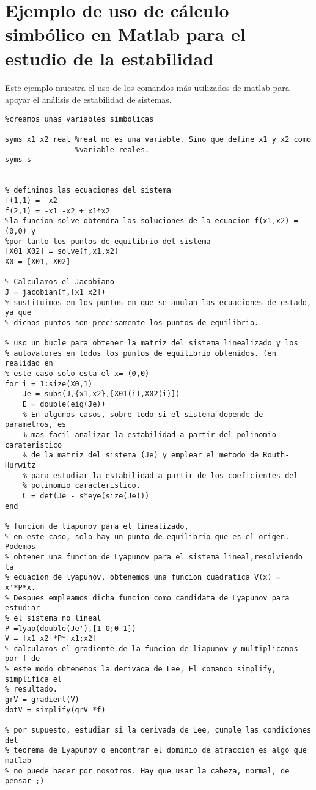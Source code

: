 \chapter[Cálculo simbolico]{Ejemplo de uso de cálculo simbólico en Matlab para el estudio de la estabilidad}
Este ejemplo muestra el uso de los comandos más utilizados de matlab para apoyar el análisis de estabilidad de sistemas.

\begin{lstlisting}
%creamos unas variables simbolicas

syms x1 x2 real %real no es una variable. Sino que define x1 y x2 como
                %variable reales. 
syms s


% definimos las ecuaciones del sistema
f(1,1) =  x2
f(2,1) = -x1 -x2 + x1*x2 
%la funcion solve obtendra las soluciones de la ecuacion f(x1,x2) =(0,0) y
%por tanto los puntos de equilibrio del sistema
[X01 X02] = solve(f,x1,x2)
X0 = [X01, X02]

% Calculamos el Jacobiano
J = jacobian(f,[x1 x2])
% sustituimos en los puntos en que se anulan las ecuaciones de estado, ya que
% dichos puntos son precisamente los puntos de equilibrio. 

% uso un bucle para obtener la matriz del sistema linealizado y los
% autovalores en todos los puntos de equilibrio obtenidos. (en realidad en
% este caso solo esta el x= (0,0)
for i = 1:size(X0,1)
    Je = subs(J,{x1,x2},[X01(i),X02(i)])
    E = double(eig(Je))
    % En algunos casos, sobre todo si el sistema depende de parametros, es
    % mas facil analizar la estabilidad a partir del polinomio carateristico
    % de la matriz del sistema (Je) y emplear el metodo de Routh-Hurwitz
    % para estudiar la estabilidad a partir de los coeficientes del
    % polinomio caracteristico.
    C = det(Je - s*eye(size(Je)))
end

% funcion de liapunov para el linealizado,
% en este caso, solo hay un punto de equilibrio que es el origen. Podemos
% obtener una funcion de Lyapunov para el sistema lineal,resolviendo la
% ecuacion de lyapunov, obtenemos una funcion cuadratica V(x) = x'*P*x. 
% Despues empleamos dicha funcion como candidata de Lyapunov para estudiar
% el sistema no lineal
P =lyap(double(Je'),[1 0;0 1])
V = [x1 x2]*P*[x1;x2]
% calculamos el gradiente de la funcion de liapunov y multiplicamos por f de
% este modo obtenemos la derivada de Lee, El comando simplify, simplifica el
% resultado.
grV = gradient(V)
dotV = simplify(grV'*f)

% por supuesto, estudiar si la derivada de Lee, cumple las condiciones del
% teorema de Lyapunov o encontrar el dominio de atraccion es algo que matlab
% no puede hacer por nosotros. Hay que usar la cabeza, normal, de pensar ;)


\end{lstlisting}
